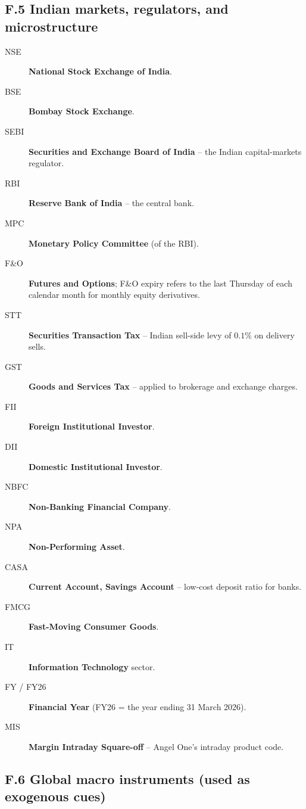 \subsection*{F.5 Indian markets, regulators, and microstructure}

\begin{description}
    \item[NSE] \textbf{National Stock Exchange of India}.
    \item[BSE] \textbf{Bombay Stock Exchange}.
    \item[SEBI] \textbf{Securities and Exchange Board of India} -- the Indian capital-markets regulator.
    \item[RBI] \textbf{Reserve Bank of India} -- the central bank.
    \item[MPC] \textbf{Monetary Policy Committee} (of the RBI).
    \item[F\&O] \textbf{Futures and Options}; F\&O expiry refers to the last Thursday of each calendar month for monthly equity derivatives.
    \item[STT] \textbf{Securities Transaction Tax} -- Indian sell-side levy of $0.1\%$ on delivery sells.
    \item[GST] \textbf{Goods and Services Tax} -- applied to brokerage and exchange charges.
    \item[FII] \textbf{Foreign Institutional Investor}.
    \item[DII] \textbf{Domestic Institutional Investor}.
    \item[NBFC] \textbf{Non-Banking Financial Company}.
    \item[NPA] \textbf{Non-Performing Asset}.
    \item[CASA] \textbf{Current Account, Savings Account} -- low-cost deposit ratio for banks.
    \item[FMCG] \textbf{Fast-Moving Consumer Goods}.
    \item[IT] \textbf{Information Technology} sector.
    \item[FY / FY26] \textbf{Financial Year} (FY26 = the year ending 31 March 2026).
    \item[MIS] \textbf{Margin Intraday Square-off} -- Angel One's intraday product code.
\end{description}

\subsection*{F.6 Global macro instruments (used as exogenous cues)}

